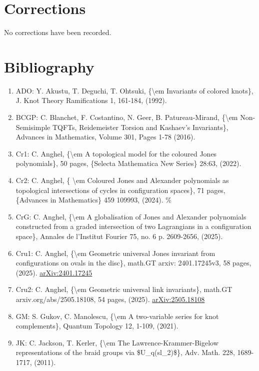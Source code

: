 \documentclass[11pt]{article}
\begin{document}
\section*{Corrections}
No corrections have been recorded.

\section*{Bibliography}
\begin{enumerate}[leftmargin=*]
  \item ADO: Y. Akustu, T. Deguchi, T. Ohtsuki, \{\textbackslash{}em Invariants of colored knots\}, J. Knot Theory Ramifications 1, 161-184, (1992).
  \item BCGP: C. Blanchet, F. Costantino, N. Geer, B. Patureau-Mirand, \{\textbackslash{}em Non-Semisimple TQFTs, Reidemeister Torsion and Kashaev's Invariants\}, Advances in Mathematics, Volume 301, Pages 1-78 (2016).
  \item Cr1: C. Anghel, \{\textbackslash{}em A topological model for the coloured Jones polynomials\}, 50 pages, \{Selecta Mathematica New Series\} 28:63, (2022).
  \item Cr2: C. Anghel, \{ \textbackslash{}em Coloured Jones and Alexander polynomials as topological intersections of cycles in configuration spaces\}, 71 pages, \{Advances in Mathematics\} 459 109993, (2024). \%
  \item CrG: C. Anghel, \{\textbackslash{}em A globalisation of Jones and Alexander polynomials constructed from a graded intersection of two Lagrangians in a configuration space\}, Annales de l’Institut Fourier 75, no. 6 p. 2609-2656, (2025).
  \item Cru1: C. Anghel, \{\textbackslash{}em Geometric universal Jones invariant from configurations on ovals in the disc\}, math.GT arxiv: 2401.17245v3, 58 pages, (2025). \href{https://arxiv.org/abs/2401.17245}{arXiv:2401.17245}
  \item Cru2: C. Anghel, \{\textbackslash{}em Geometric universal link invariants\}, math.GT arxiv.org/abs/2505.18108, 54 pages, (2025). \href{https://arxiv.org/abs/2505.18108}{arXiv:2505.18108}
  \item GM: S. Gukov, C. Manolescu, \{\textbackslash{}em A two-variable series for knot complements\}, Quantum Topology 12, 1-109, (2021).
  \item JK: C. Jackson, T. Kerler, \{\textbackslash{}em The Lawrence-Krammer-Bigelow representations of the braid groups via \$U\_q(sl\_2)\$\}, Adv. Math. 228, 1689-1717, (2011).

\end{enumerate}
\end{document}
